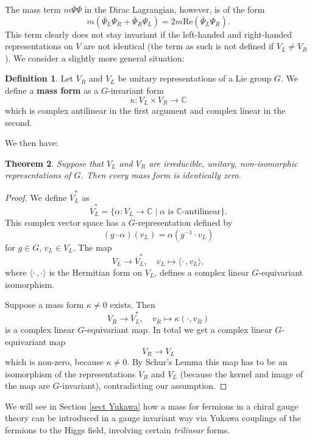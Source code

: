 \documentclass[11pt]{amsart}
\newtheorem{thm}{Theorem}[section]
\theoremstyle{definition}
\newtheorem{defn}[thm]{Definition}
\theoremstyle{remark}
\numberwithin{equation}{section}
\begin{document}
The mass term $m\overline{\Psi}\Psi$ in the Dirac Lagrangian, however, is of the form
\begin{equation*}
m\left(\overline{\Psi}_L\Psi_R+\overline{\Psi}_R\Psi_L\right)=2m\mathrm{Re}\left(\overline{\Psi}_L\Psi_R\right).
\end{equation*}
This term clearly does not stay invariant if the left-handed and right-handed representations on $V$ are not identical (the term as such is not defined if $V_L\neq V_R$). We consider a slightly more general situation:
\begin{defn}Let $V_R$ and $V_L$ be unitary representations of a Lie group $G$. We define a {\bf mass form} as a $G$-invariant form
\begin{equation*}
\kappa\colon V_L\times V_R\longrightarrow \mathbb{C}
\end{equation*}
which is complex antilinear in the first argument and complex linear in the second.
\end{defn}
We then have:
\begin{thm}
Suppose that $V_L$ and $V_R$ are irreducible, unitary, non-isomorphic representations of $G$. Then every mass form is identically zero.
\end{thm}
\begin{proof} We define $\overline{V}_L^*$ as
\begin{equation*}
\overline{V}_L^*=\{\alpha\colon V_L\rightarrow\mathbb{C}\mid \alpha\text{ is $\mathbb{C}$-antilinear}\}.
\end{equation*}
This complex vector space has a $G$-representation defined by
\begin{equation*}
(g\cdot\alpha)(v_L)=\alpha\left(g^{-1}\cdot v_L\right)
\end{equation*}
for $g\in G$, $v_L\in V_L$. The map
\begin{equation*}
V_L\longrightarrow \overline{V}_L^*,\quad v_L\longmapsto \langle\cdot\,,v_L\rangle,
\end{equation*}
where $\langle\cdot\,,\cdot\rangle$ is the Hermitian form on $V_L$, defines a complex linear $G$-equivariant isomorphism.

Suppose a mass form $\kappa\neq 0$ exists. Then
\begin{equation*}
V_R\longrightarrow \overline{V}_L^*,\quad v_R\longmapsto \kappa(\cdot,v_R)
\end{equation*}
is a complex linear $G$-equivariant map. In total we get a complex linear $G$-equivariant map
\begin{equation*}
V_R\longrightarrow V_L
\end{equation*}
which is non-zero, because $\kappa\neq 0$. By Schur's Lemma this map has to be an isomorphism of the representations $V_R$ and $V_L$ (because the kernel and image of the map are $G$-invariant), contradicting our assumption.
\end{proof}
We will see in Section \ref{sect Yukawa} how a mass for fermions in a chiral gauge theory can be introduced in a gauge invariant way via Yukawa couplings of the fermions to the Higgs field, involving certain {\em trilinear} forms.
\end{document}
